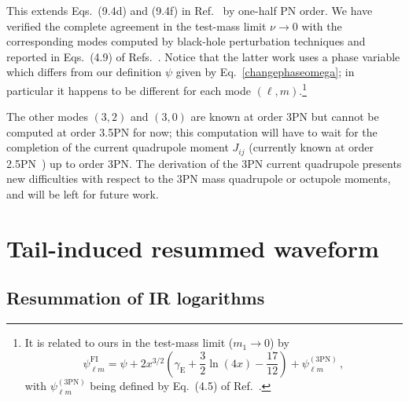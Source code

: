\documentclass[prd,preprint,superscriptaddress,tightenlines,nofootinbib,
  eqsecnum,showpacs]{revtex4}
\begin{document}
%
This extends Eqs.~(9.4d) and (9.4f) in Ref.~\cite{BFIS08} by one-half
PN order. We have verified the complete agreement in the test-mass
limit $\nu\to 0$ with the corresponding modes computed by black-hole
perturbation techniques and reported in Eqs.~(4.9) of
Refs.~\cite{FI10}. Notice that the latter work uses a phase variable
which differs from our definition $\psi$ given by
Eq.~\eqref{changephaseomega}; in particular it happens to be different
for each mode $(\ell, m)$.\footnote{It is related to ours in the
    test-mass limit ($m_1\to 0$) by
%
$$\psi^\text{FI}_{\ell m} = \psi + 2 x^{3/2} \left(\gamma_\text{E} +
  \frac{3}{2}\ln \left(4 x\right) - \frac{17}{12} \right) + \psi_{\ell
    m}^{(3\text{PN})}\,,$$
%
with $\psi_{\ell m}^{(3\text{PN})}$ being defined by Eq.~(4.5) of
Ref.~\cite{FI10}.}

The other modes $(3,2)$ and $(3,0)$ are known at order 3PN but cannot
be computed at order 3.5PN for now; this computation will have to wait
for the completion of the current quadrupole moment $J_{ij}$
(currently known at order 2.5PN~\cite{BFIS08}) up to order 3PN. The
derivation of the 3PN current quadrupole presents new difficulties
with respect to the 3PN mass quadrupole or octupole moments, and will
be left for future work.

\section{Tail-induced resummed waveform}
\label{sec:factor}

\subsection{Resummation of IR logarithms}
\label{sec:resum}
\end{document}
